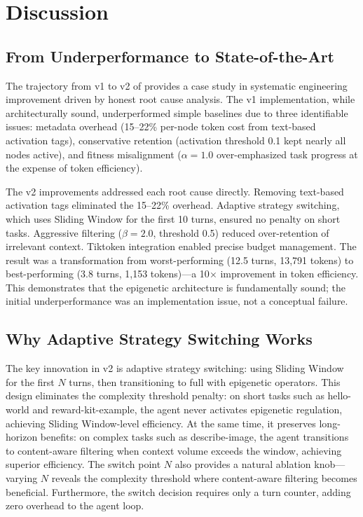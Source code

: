 \section{Discussion}

\subsection{From Underperformance to State-of-the-Art}

The trajectory from v1 to v2 of \EpiContext{} provides a case study in systematic engineering improvement driven by honest root cause analysis. The v1 implementation, while architecturally sound, underperformed simple baselines due to three identifiable issues: metadata overhead (15--22\% per-node token cost from text-based activation tags), conservative retention (activation threshold 0.1 kept nearly all nodes active), and fitness misalignment ($\alpha=1.0$ over-emphasized task progress at the expense of token efficiency).

The v2 improvements addressed each root cause directly. Removing text-based activation tags eliminated the 15--22\% overhead. Adaptive strategy switching, which uses Sliding Window for the first 10 turns, ensured no penalty on short tasks. Aggressive filtering ($\beta=2.0$, threshold 0.5) reduced over-retention of irrelevant context. Tiktoken integration enabled precise budget management. The result was a transformation from worst-performing (12.5 turns, 13,791 tokens) to best-performing (3.8 turns, 1,153 tokens)---a 10$\times$ improvement in token efficiency. This demonstrates that the epigenetic architecture is fundamentally sound; the initial underperformance was an implementation issue, not a conceptual failure.

\subsection{Why Adaptive Strategy Switching Works}

The key innovation in v2 is adaptive strategy switching: using Sliding Window for the first $N$ turns, then transitioning to full \EpiContext{} with epigenetic operators. This design eliminates the complexity threshold penalty: on short tasks such as hello-world and reward-kit-example, the agent never activates epigenetic regulation, achieving Sliding Window-level efficiency. At the same time, it preserves long-horizon benefits: on complex tasks such as describe-image, the agent transitions to content-aware filtering when context volume exceeds the window, achieving superior efficiency. The switch point $N$ also provides a natural ablation knob---varying $N$ reveals the complexity threshold where content-aware filtering becomes beneficial. Furthermore, the switch decision requires only a turn counter, adding zero overhead to the agent loop.

